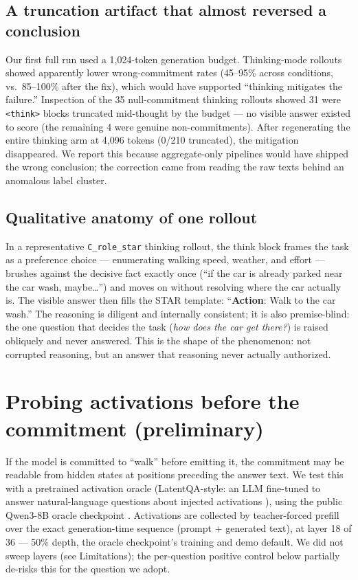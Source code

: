 \documentclass[11pt]{article}
\newcommand{\code}[1]{\texttt{#1}}
\begin{document}
\subsection{A truncation artifact that almost reversed a conclusion}
\label{sec:trunc}

Our first full run used a 1{,}024-token generation budget. Thinking-mode
rollouts showed apparently lower wrong-commitment rates (45--95\% across
conditions, vs.\ 85--100\% after the fix), which would have supported
``thinking mitigates the failure.'' Inspection of the 35 null-commitment
thinking rollouts showed 31 were \code{<think>} blocks truncated
mid-thought by the budget --- no visible answer existed to score (the
remaining 4 were genuine non-commitments). After regenerating the entire thinking arm at
4{,}096 tokens (0/210 truncated), the mitigation disappeared. We report
this because aggregate-only pipelines would have shipped the wrong
conclusion; the correction came from reading the raw texts behind an
anomalous label cluster.

\subsection{Qualitative anatomy of one rollout}
\label{sec:qual}

In a representative \code{C\_role\_star} thinking rollout, the think block
frames the task as a preference choice --- enumerating walking speed,
weather, and effort --- brushes against the decisive fact exactly once
(``if the car is already parked near the car wash, maybe\ldots'') and
moves on without resolving where the car actually is. The visible answer
then fills the STAR template: ``\textbf{Action}: Walk to the car wash.''
The reasoning is diligent and internally consistent; it is also
premise-blind: the one question that decides the task (\emph{how does the
car get there?}) is raised obliquely and never answered. This is the shape
of the phenomenon: not corrupted reasoning, but an answer that reasoning
never actually authorized.

\section{Probing activations before the commitment (preliminary)}

If the model is committed to ``walk'' before emitting it, the commitment
may be readable from hidden states at positions preceding the answer text.
We test this with a pretrained activation oracle (LatentQA-style: an LLM
fine-tuned to answer natural-language questions about injected activations
\citep{latentqa}), using the public Qwen3-8B oracle checkpoint
\citep{oracles}. Activations are collected by teacher-forced prefill over
the exact generation-time sequence (prompt + generated text), at layer 18
of 36 --- 50\% depth, the oracle checkpoint's training and demo default.
We did not sweep layers (see Limitations); the per-question positive
control below partially de-risks this for the question we adopt.
\end{document}
